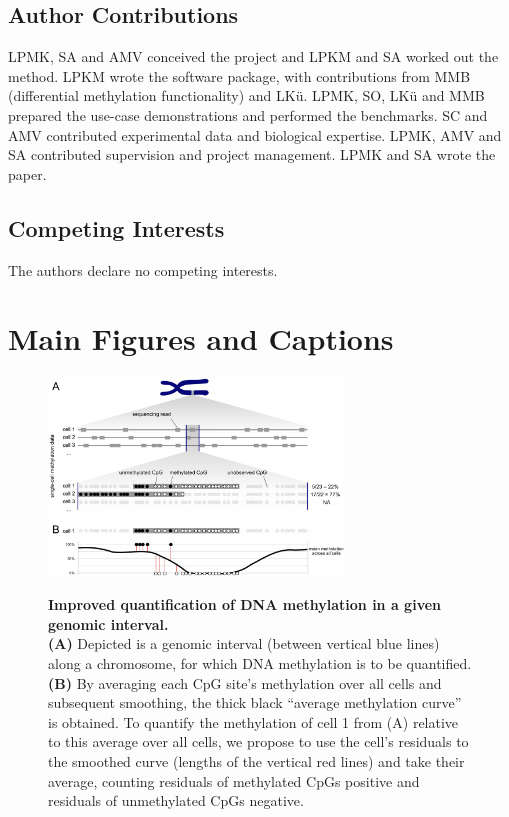 \documentclass[10pt]{article}
\begin{document}
\subsection*{Author Contributions}

LPMK, SA and AMV conceived the project and LPKM and SA worked out the method.
LPKM wrote the software package, with contributions from MMB (differential methylation functionality) and LKü.
LPMK, SO, LKü and MMB prepared the use-case demonstrations and performed the benchmarks.
SC and AMV contributed experimental data and biological expertise.
LPMK, AMV and SA contributed supervision and project management.
LPMK and SA wrote the paper.


\subsection*{Competing Interests}
The authors declare no competing interests.


\section*{Main Figures and Captions}

\begin{figure}[p]
	\begin{center}
		\includegraphics[width=0.7\textwidth]{figures/Fig_residuals_AB.pdf}\\
	\end{center}
	\caption{\small \textbf{Improved quantification of DNA methylation in a given genomic interval.}\\
		\textbf{(A)} Depicted is a genomic interval (between vertical blue lines) along a chromosome, for which DNA methylation is to be quantified.
		\textbf{(B)} By averaging each CpG site's methylation over all cells and subsequent smoothing, the thick black ``average methylation curve'' is obtained.
		To quantify the methylation of cell 1 from (A) relative to this average over all cells, we propose to use the cell's residuals to the smoothed curve (lengths of the vertical red lines) and take their average, counting residuals of methylated CpGs positive and residuals of unmethylated CpGs negative.}
	\label{fig:smoothres}
\end{figure}
\end{document}
